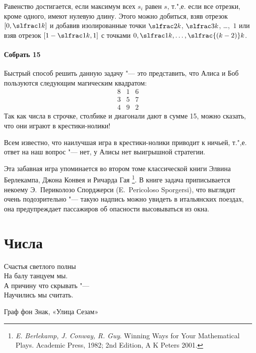 \documentclass[twoside]{book}
\begin{document}
Равенство достигается, если максимум всех $s_i$ равен $s$, 
т.",е. если все отрезки, кроме одного, имеют нулевую длину.
Этого можно добиться, взяв отрезок $[0,\slfrac1k]$ и добавив изолированные точки
$\slfrac2k$, $\slfrac3k$, \dots,~$1$ или взяв отрезок $[1-\slfrac1k,1]$ с точками
$0,\slfrac1k,\dots,\slfrac{(k-2)}k$. %

\subsubsection*{Собрать 15} %

Быстрый способ решить данную задачу "--- это представить, что Алиса и Боб пользуются следующим магическим квадратом:
$$
\begin{matrix}
8&1&6\\
3&5&7\\
4&9&2
\end{matrix}
$$
Так как числа в строчке, столбике и диагонали дают в сумме 15, можно сказать, что они играют в крестики-нолики! 

Всем известно, что наилучшая игра в крестики-нолики приводит к ничьей,
т.",е. ответ на наш вопрос "--- нет, у Алисы нет выигрышной стратегии.
\heart

Эта забавная игра упоминается во втором томе классической книги Элвина Берлекампа, Джона Конвея и Ричарда Гая%
\footnote{\emph{E. Berlekamp, J. Conway, R. Guy}. {Winning Ways for Your Mathematical Plays.} Academic Press, 1982; 2nd Edition, A K Peters 2001.}.
В книге задача приписывается некоему Э.~Периколозо Спорджерси (E.~Pe\-ri\-coloso Sporgersi), что выглядит очень подозрительно "--- такую надпись можно увидеть в итальянских поездах, она предупреждает пассажиров об опасности высовываться из окна.



\chapter{Числа}

\setlength{\epigraphwidth}{.4\textwidth}
\epigraph{Счастья светлого полны\\ %
На балу танцуем мы.\\ %
А причину что скрывать "---\\ %
Научились мы считать.\vspace{1ex}}{Граф фон Знак, «Улица Сезам»}
\end{document}
